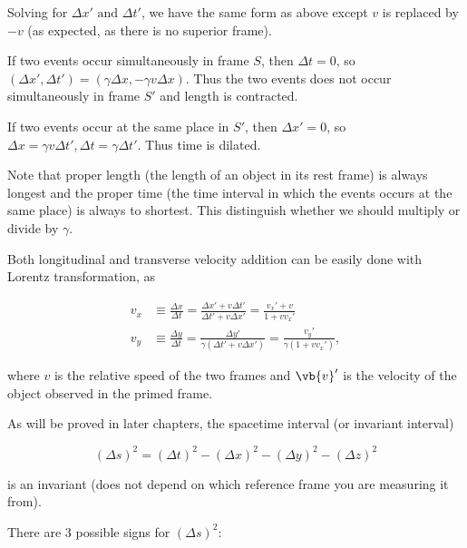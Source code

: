 \documentclass[english,a4paper,12pt]{report}
\begin{document}
Solving for \(\Delta x' \text { and }  \Delta t'\), we have the same form as above except \(v\) is replaced by \(-v\) (as expected, as there is no superior frame).   


If two events occur simultaneously in frame \(S\), then \(\Delta t = 0\), so \((\Delta x', \Delta t') = (\gamma \Delta x, -\gamma v \Delta x)\). Thus the two events does not occur simultaneously in frame \(S'\) and length is contracted.

If two events occur at the same place in \(S'\), then \(\Delta x' = 0\), so \(\Delta x = \gamma v\Delta t', \Delta t = \gamma \Delta t'\). Thus time is dilated. 

Note that proper length (the length of an object in its rest frame) is always longest and the proper time (the time interval in which the events occurs at the same place) is always to shortest. This distinguish whether we should multiply or divide by \(\gamma \). 

Both longitudinal and transverse velocity addition can be easily done with Lorentz transformation, as

\begin{equation}
    \begin{aligned}
    v_{x}  &\equiv \frac{\Delta x}{\Delta t} = \frac{\Delta x' + v\Delta t'}{\Delta t' + v\Delta x'} = \frac{v_{x} ' + v}{1+v v_{x} '} \\
    v_{y}  &\equiv \frac{\Delta y}{\Delta t} = \frac{\Delta y'}{\gamma (\Delta t' + v\Delta x')} = \frac{v_{y} '}{\gamma (1 + v v_{x} ')},
    \end{aligned}
\end{equation}

where \(v\) is the relative speed of the two frames and \(\vb{v} '\) is the velocity of the object observed in the primed frame.  

As will be proved in later chapters, the spacetime interval (or invariant interval)

\begin{equation}
    (\Delta s) ^2 = (\Delta t)^2- (\Delta x)^2 - (\Delta y)^2 - (\Delta z)^2 
\end{equation}

is an invariant (does not depend on which reference frame you are measuring it from). 

There are 3 possible signs for \((\Delta s)^2\):
\end{document}
